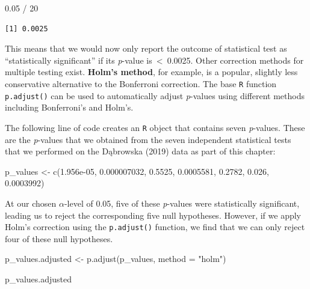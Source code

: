 \documentclass[
  letterpaper,
  DIV=11,
  numbers=noendperiod]{scrreprt}
\newenvironment{Shaded}{\begin{snugshade}}{\end{snugshade}}
\newcommand{\AttributeTok}[1]{\textcolor[rgb]{0.40,0.45,0.13}{#1}}
\newcommand{\DecValTok}[1]{\textcolor[rgb]{0.68,0.00,0.00}{#1}}
\newcommand{\FloatTok}[1]{\textcolor[rgb]{0.68,0.00,0.00}{#1}}
\newcommand{\FunctionTok}[1]{\textcolor[rgb]{0.28,0.35,0.67}{#1}}
\newcommand{\NormalTok}[1]{\textcolor[rgb]{0.00,0.23,0.31}{#1}}
\newcommand{\OtherTok}[1]{\textcolor[rgb]{0.00,0.23,0.31}{#1}}
\newcommand{\SpecialCharTok}[1]{\textcolor[rgb]{0.37,0.37,0.37}{#1}}
\newcommand{\StringTok}[1]{\textcolor[rgb]{0.13,0.47,0.30}{#1}}
\begin{document}
\begin{Shaded}
\begin{Highlighting}[]
\FloatTok{0.05} \SpecialCharTok{/} \DecValTok{20}
\end{Highlighting}
\end{Shaded}

\begin{verbatim}
[1] 0.0025
\end{verbatim}

This means that we would now only report the outcome of statistical test
as ``statistically significant'' if its \emph{p}-value
is~\textless~0.0025. Other correction methods for multiple testing
exist. \textbf{Holm's method}, for example, is a popular, slightly less
conservative alternative to the Bonferroni correction. The base
\texttt{R} function \texttt{p.adjust()} can be used to automatically
adjust \emph{p}-values using different methods including Bonferroni's
and Holm's.

The following line of code creates an \texttt{R} object that contains
seven \emph{p}-values. These are the \emph{p}-values that we obtained
from the seven independent statistical tests that we performed on the
Dąbrowska (2019) data as part of this chapter:

\begin{Shaded}
\begin{Highlighting}[]
\NormalTok{p\_values }\OtherTok{\textless{}{-}} \FunctionTok{c}\NormalTok{(}\FloatTok{1.956e{-}05}\NormalTok{, }\FloatTok{0.000007032}\NormalTok{, }\FloatTok{0.5525}\NormalTok{, }\FloatTok{0.0005581}\NormalTok{, }\FloatTok{0.2782}\NormalTok{, }\FloatTok{0.026}\NormalTok{, }\FloatTok{0.0003992}\NormalTok{)}
\end{Highlighting}
\end{Shaded}

At our chosen \(\alpha\)-level of 0.05, five of these \emph{p}-values
were statistically significant, leading us to reject the corresponding
five null hypotheses. However, if we apply Holm's correction using the
\texttt{p.adjust()} function, we find that we can only reject four of
these null hypotheses.

\begin{Shaded}
\begin{Highlighting}[]
\NormalTok{p\_values.adjusted }\OtherTok{\textless{}{-}} \FunctionTok{p.adjust}\NormalTok{(p\_values, }\AttributeTok{method =} \StringTok{"holm"}\NormalTok{)}

\NormalTok{p\_values.adjusted}
\end{Highlighting}
\end{Shaded}
\end{document}
